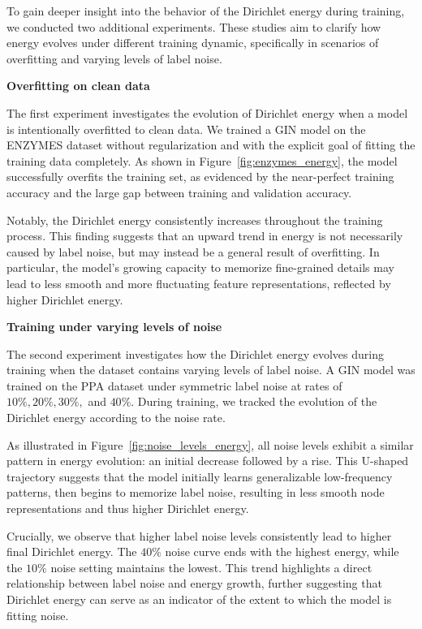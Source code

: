 
To gain deeper insight into the behavior of the Dirichlet energy during training, we conducted two additional experiments. These studies aim to clarify how energy evolves under different training dynamic, specifically in scenarios of overfitting and varying levels of label noise.


\textbf{Overfitting on clean data}

The first experiment investigates the evolution of Dirichlet energy when a model is intentionally overfitted to clean data.
We trained a GIN model on the ENZYMES dataset without regularization and with the explicit goal of fitting the training data completely. As shown in Figure~\ref{fig:enzymes_energy}, the model successfully overfits the training set, as evidenced by the near-perfect training accuracy and the large gap between training and validation accuracy.

Notably, the Dirichlet energy consistently increases throughout the training process. This finding suggests that an upward trend in energy is not necessarily caused by label noise, but may instead be a general result of overfitting. In particular, the model’s growing capacity to memorize fine-grained details may lead to less smooth and more fluctuating feature representations, reflected by higher Dirichlet energy.

\textbf{Training under varying levels of noise}

The second experiment investigates how the Dirichlet energy evolves during training when the dataset contains varying levels of label noise.
A GIN model was trained on the PPA dataset under symmetric label noise at rates of $10\%, 20\%, 30\%,$ and $40\%$. During training, we tracked the evolution of the Dirichlet energy according to the noise rate.

As illustrated in Figure~\ref{fig:noise_levels_energy}, all noise levels exhibit a similar pattern in energy evolution: an initial decrease followed by a rise. This U-shaped trajectory suggests that the model initially learns generalizable low-frequency patterns, then begins to memorize label noise, resulting in less smooth node representations and thus higher Dirichlet energy.

Crucially, we observe that higher label noise levels consistently lead to higher final Dirichlet energy. The $40\%$ noise curve ends with the highest energy, while the $10\%$ noise setting maintains the lowest. This trend highlights a direct relationship between label noise and energy growth, further suggesting that Dirichlet energy can serve as an indicator of the extent to which the model is fitting noise.





